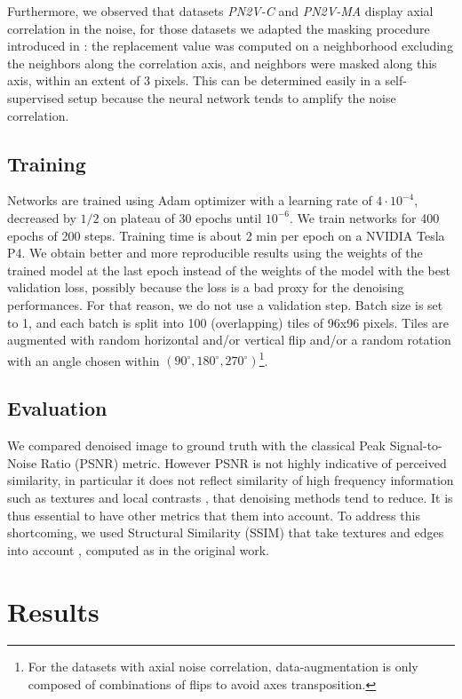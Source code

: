 \documentclass{article}
\begin{document}
Furthermore, we observed that datasets \emph{PN2V-C} and \emph{PN2V-MA} display axial correlation in the noise, for those datasets we adapted the masking procedure introduced in \cite{broaddus2020removing}: the replacement value was computed on a neighborhood excluding the neighbors along the correlation axis, and neighbors were masked along this axis, within an extent of 3 pixels. This can be determined easily in a self-supervised setup because the neural network tends to amplify the noise correlation.

\subsection{Training}
\label{sec:training}
Networks are trained using Adam optimizer with a learning rate of $4\cdot10^{-4}$, decreased by $1/2$ on plateau of 30 epochs until $10^{-6}$. We train networks for 400 epochs of 200 steps.
Training time is about 2 min per epoch on a NVIDIA Tesla P4.
We obtain better and more reproducible results using the weights of the trained model at the last epoch instead of the weights of the model with the best validation loss, possibly because the loss is a bad proxy for the denoising performances. For that reason, we do not use a validation step.
Batch size is set to 1, and each batch is split into 100 (overlapping) tiles of 96x96 pixels.
Tiles are augmented with random horizontal and/or vertical flip and/or a random rotation with an angle chosen within $(90^\circ, 180^\circ, 270^\circ)$\footnote{For the datasets with axial noise correlation, data-augmentation is only composed of combinations of flips to avoid axes transposition.}.

\subsection{Evaluation}
We compared denoised image to ground truth with the classical Peak Signal-to-Noise Ratio (PSNR) metric.
However PSNR is not highly indicative of perceived similarity, in particular it does not reflect similarity of high frequency information such as textures and local contrasts \cite{wang2004image}, that denoising methods tend to reduce. It is thus essential to have other metrics that them into account.
To address this shortcoming, we used Structural Similarity (SSIM) that take textures and edges into account \cite{wang2004image}, computed as in the original work.

\section{Results}
\label{sec:results}
\end{document}

